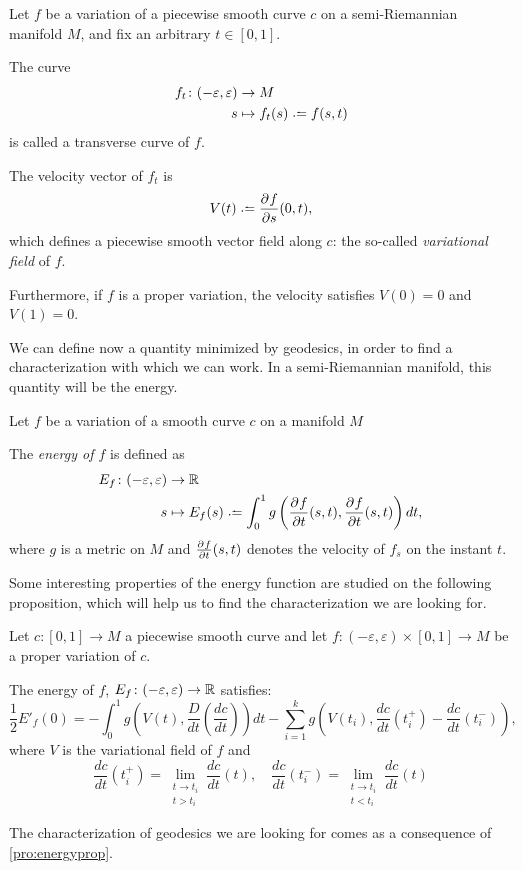 \begin{definition}
	Let $f$ be a variation of a piecewise smooth curve $c$ on a semi-Riemannian manifold $M$, and fix an arbitrary $t \in [0,1]$.
	
	The curve
	\begin{align*}
		f_t \colon (-\varepsilon, \varepsilon) &\to M \\
		s &\mapsto f_t(s) \defeq f(s,t)
	\end{align*}
is called a transverse curve of $f$.
\end{definition}

The velocity vector of $f_t$ is
\[
V(t) \defeq \pd{f}{s}(0,t),
\]
which defines a piecewise smooth vector field along $c$: the so-called \emph{variational field} of $f$.

Furthermore, if $f$ is a proper variation, the velocity satisfies $V(0) = 0$ and $V(1) = 0$.

We can define now a quantity minimized by geodesics, in order to find a characterization with which we can work. In a semi-Riemannian manifold, this quantity will be the energy.

\begin{definition}
	\label{def:energy}
	Let $f$ be a variation of a smooth curve $c$ on a manifold $M$
	
	The \emph{energy of $f$} is defined as
	\begin{align*}
		E_f \colon (-\varepsilon, \varepsilon) &\to \R \\
		s &\mapsto E_f(s) \defeq \int_0^1 g \left( \pd{f}{t}(s,t), \pd{f}{t}(s,t) \right) dt,
	\end{align*}
	where $g$ is a metric on $M$ and $\frac{\partial^{} f}{\partial t}(s,t)$ denotes the velocity of $f_s$ on the instant $t$.
\end{definition}

Some interesting properties of the energy function are studied on the following proposition, which will help us to find the characterization we are looking for.

\begin{proposition}
	\label{pro:energyprop}
	Let $c \colon [0,1] \to M$ a piecewise smooth curve and let $f \colon (-\varepsilon, \varepsilon) \times [0,1] \to M$ be a proper variation of $c$.
	
	The energy of $f$, $E_f \colon (-\varepsilon, \varepsilon) \to \mathbb{R}$ satisfies:
	\[
		\frac{1}{2} E'_f(0) = - \int_0^1 g\left( V(t), \frac{D}{dt}\left(\frac{dc}{dt}\right) \right)dt - \sum_{i=1}^k g \left( V(t_i), \frac{dc}{dt}(t_i^+) - \frac{dc}{dt}(t_i^-) \right),
	\]
	where $V$ is the variational field of $f$ and
	\[
		\frac{dc}{dt}(t_i^+) = \lim_{\substack{t \to t_i \\ t > t_i}} \frac{dc}{dt}(t), \quad \frac{dc}{dt}(t_i^-) = \lim_{\substack{t \to t_i \\ t < t_i}} \frac{dc}{dt}(t)
	\]
\end{proposition}
The characterization of geodesics we are looking for comes as a consequence of \autoref{pro:energyprop}.

